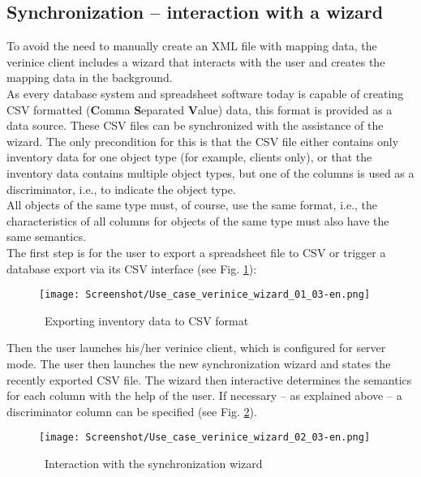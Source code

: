 \documentclass[a4paper,10pt]{book}
\begin{document}
\subsection{Synchronization – interaction with a wizard}
To avoid the need to manually create an XML file with mapping data, the verinice client includes a wizard that
interacts with the user and creates the mapping data in the background.
\newline\\
As every database system and spreadsheet software today is capable of creating CSV formatted (\textbf{C}omma
\textbf{S}eparated \textbf{V}alue) data, this format is provided as a data source. These CSV files can be
synchronized with the assistance of the wizard. The only precondition for this is that the CSV file either
contains only inventory data for one object type (for example, clients only), or that the inventory data
contains multiple object types, but one of the columns is used as a discriminator, i.e., to indicate
the object type.
\newline\\
All objects of the same type must, of course, use the same format, i.e., the characteristics of all columns
for objects of the same type must also have the same semantics.
\newline\\
The first step is for the user to export a spreadsheet file to CSV or trigger a database export via its CSV interface (see Fig. \ref{Exporting inventory data to CSV format}):
\newline
\begin{figure}[htb!]
  \centering
  \texttt{[image: Screenshot/Use\_case\_verinice\_wizard\_01\_03-en.png]}
  \caption{\label{Exporting inventory data to CSV format} \ Exporting inventory data to CSV format}
\end{figure}
\newline
Then the user launches his/her verinice client, which is configured for server mode. The user then
launches the new synchronization wizard and states the recently exported CSV file. The wizard then
interactive determines the semantics for each column with the help of the user. If necessary – as
explained above – a discriminator column can be specified (see Fig. \ref{Interaction with the synchronization wizard}).
\newline
\begin{figure}[htb!]
  \centering
  \texttt{[image: Screenshot/Use\_case\_verinice\_wizard\_02\_03-en.png]}
  \caption{\label{Interaction with the synchronization wizard} \ Interaction with the synchronization wizard}
\end{figure}
\end{document}
